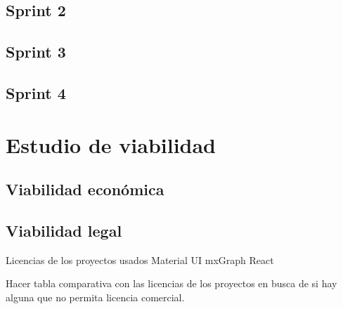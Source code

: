 \subsection{Sprint 2}

\subsection{Sprint 3}

\subsection{Sprint 4}

\section{Estudio de viabilidad}

\subsection{Viabilidad económica}

\subsection{Viabilidad legal}
Licencias de los proyectos usados
Material UI
mxGraph
React

Hacer tabla comparativa con las licencias de los proyectos en busca de si hay alguna que no permita licencia comercial.


